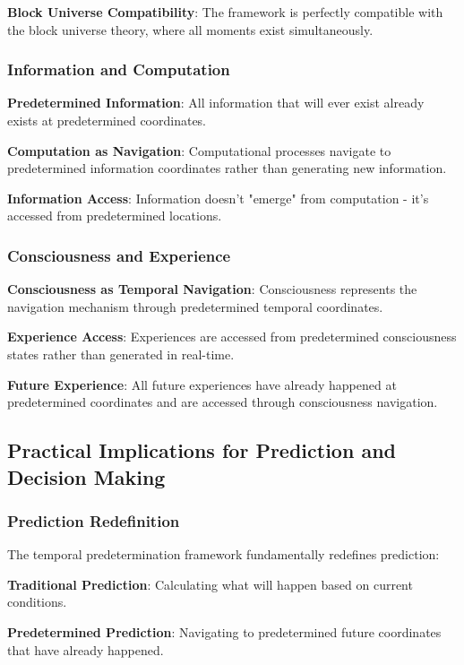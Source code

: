 \documentclass[12pt,a4paper]{article}
\theoremstyle{definition}
\begin{document}
{\textbf{Block Universe Compatibility}: The framework is perfectly compatible with the block universe theory, where all moments exist simultaneously.

\subsubsection{Information and Computation}

\textbf{Predetermined Information}: All information that will ever exist already exists at predetermined coordinates.

\textbf{Computation as Navigation}: Computational processes navigate to predetermined information coordinates rather than generating new information.

\textbf{Information Access}: Information doesn't "emerge" from computation - it's accessed from predetermined locations.

\subsubsection{Consciousness and Experience}

\textbf{Consciousness as Temporal Navigation}: Consciousness represents the navigation mechanism through predetermined temporal coordinates.

\textbf{Experience Access}: Experiences are accessed from predetermined consciousness states rather than generated in real-time.

\textbf{Future Experience}: All future experiences have already happened at predetermined coordinates and are accessed through consciousness navigation.

\subsection{Practical Implications for Prediction and Decision Making}

\subsubsection{Prediction Redefinition}

The temporal predetermination framework fundamentally redefines prediction:

\textbf{Traditional Prediction}: Calculating what will happen based on current conditions.

\textbf{Predetermined Prediction}: Navigating to predetermined future coordinates that have already happened.

}
\end{document}
